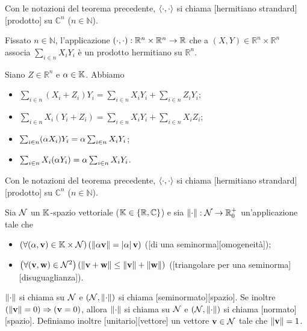 \begin{Definition}
	Con le notazioni del teorema precedente, $\left \langle \cdot , \cdot \right \rangle$ si
  chiama
  [hermitiano strandard][prodotto]
  su $\mathbb{C}^n$ ($n \in \mathbb{N}$).
\end{Definition}
\begin{Theorem}
	Fissato $n \in \mathbb{N}$, l'applicazione
  $\left ( \cdot , \cdot \right ):
    \mathbb{R}^n \times \mathbb{R}^n \rightarrow \mathbb{R}$ che a
  $(X,Y) \in \mathbb{R}^n \times \mathbb{R}^n$ associa
  $\sum_{i \in n} X_i Y_i$ \`e un prodotto hermitiano su $\mathbb{R}^n$.
\end{Theorem}
\Proof Siano $Z \in \mathbb{R}^n$ e $\alpha \in \mathbb{K}$. Abbiamo
\begin{itemize}
	\item $\sum_{i \in n} (X_i + Z_i) Y_i
          = \sum_{i \in n} X_i Y_i + \sum_{i \in n} Z_i Y_i$;
	\item $\sum_{i \in n} X_i (Y_i + Z_i)
          = \sum_{i \in n} X_i Y_i + \sum_{i \in n} X_i Z_i$;
	\item $\sum_{i \in n} (\alpha X_i) Y_i
          = \alpha \sum_{i \in n} X_i Y_i$;
	\item $\sum_{i \in n} X_i (\alpha Y_i)
          = \alpha \sum_{i \in n} X_i Y_i$. \EndProof
\end{itemize}
\begin{Definition}
	Con le notazioni del teorema precedente,
  $\left \langle \cdot , \cdot \right \rangle$ si chiama
  [hermitiano strandard][prodotto]
  su $\mathbb{C}^n$ ($n \in \mathbb{N}$).
\end{Definition}
\begin{Definition}
	Sia $\mathcal{N}$ un $\mathbb{K}$-spazio vettoriale
  ($\mathbb{K} \in \lbrace \mathbb{R}, \mathbb{C} \rbrace$) e sia
  $\Norm{\cdot}: \NormedSpace \rightarrow \RealNonNegative$
  un'applicazione tale che
	\begin{itemize}
		\item $\ForAll{(\Scalar,\Vector) \in \Field \times \NormedSpace}
            {\Norm{\Scalar \Vector}
              = \AbsoluteValue{\Scalar}\Vector}$
          ([di una seminorma][omogeneit\`a]);
		\item $\ForAll{(\Vector,\VarVector) \in \NormedSpace^2}
            {\Norm{\Vector + \VarVector}
              \leq \Norm{\Vector} + \Norm{\VarVector}}$
          ([triangolare per una seminorma][disuguaglianza]).
	\end{itemize}
	$\Norm{\cdot}$ si chiama  su $\mathcal{N}$ e
  $(\NormedSpace,\Norm{\cdot})$ si chiama
  [seminormato][spazio].
  Se inoltre $\Implies{\Norm{\Vector} = 0}{\Vector = 0}$,
  allora $\Norm{\cdot}$ si chiama  su $\mathcal{N}$ e
  $(\NormedSpace,\Norm{\cdot})$ si chiama
  [normato][spazio].
  Definiamo inoltre [unitario][vettore] un vettore
  $\mathbf{v} \in \mathcal{N}$ tale che $\Norm{\Vector} = 1$.
\end{Definition}
